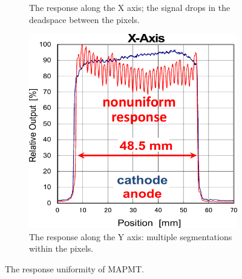 \begin{figure}[hbt]
\begin{subfigure}{0.3\linewidth}
		\caption{The response along the X axis; the signal drops in the deadspace between the pixels.}
		\label{fig:surfaceuniform2}
	\end{subfigure}
	\quad
	\begin{subfigure}{0.3\linewidth}
		\includegraphics[width=\linewidth]{figures/surfaceuniform2.pdf}
		\caption{The response along the Y axis: multiple segmentations within the pixels.}
		\label{fig:surfaceuniform3}
	\end{subfigure}
	\caption{The response uniformity of MAPMT.}
	\label{fig:surfaceuniform}
\end{figure}